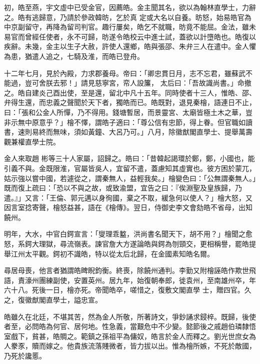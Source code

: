 \begin{pinyinscope}
 初，皓至燕，宇文虛中已受金官，因薦皓。金主聞其名，欲以為翰林直學士，力辭之。皓有逃歸意，乃請於參政韓昉，乞於真
 定或大名以自養。昉怒，始易皓官為中京副留守，再降為留司判官。趣行屢矣，皓乞不就職，昉竟不能屈。金法，雖未易官而曾經任使者，永不可歸，昉遂令皓校云中進士試，蓋欲以計墮皓也。皓復以疾辭。未幾，金主以生子大赦，許使人還鄉，皓與張邵、朱弁三人在遣中。金人懼為患，猶遣人追之，七騎及淮，而皓已登舟。



 十二年七月，見於內殿，力求郡養母。帝曰：「卿忠貫日月，志不忘君，雖蘇武不能過，豈可舍朕去邪！」請見慈寧宮，帟人設簾，
 太后曰：「吾故識尚書。」命撤之。皓自建炎己酉出使，至是還，留北中凡十五年。同時使者十三人，惟皓、邵、弁得生還，而忠義之聲聞於天下者，獨皓而已。皓既對，退見秦檜，語連日不止，曰：「張和公金人所憚，乃不得用。錢塘暫居，而景靈宮、太廟皆極土木之華，豈非示無中原意乎？」檜不懌，謂皓子適曰：「尊公信有忠節，得上眷。但官職如讀書，速則易終而無味，須如黃鐘、大呂乃可。」八月，除徽猷閣直學士、提舉萬壽觀兼權直學士院。



 金人來取趙
 彬等三十人家屬，詔歸之。皓曰：「昔韓起謁環於鄭，鄭，小國也，能引義不與。金既限淮，官屬皆吳人，宜留不遣，蓋慮知其虛實也。彼方困於蒙兀，姑示強以嘗中國，若遽從之，謂秦無人，益輕我矣。」檜變色曰：「公無謂秦無人。」既而復上疏曰：「恐以不與之故，或致渝盟，宜告之曰：『俟淵聖及皇族歸，乃遣。』」又言：「王倫、郭元邁以身徇國，棄之不取，緩急何以使人？」檜大怒，又因言室捻寄聲，檜怒益甚，語在《檜傳》。翌日，侍御史李文會劾皓不省母，出知饒州。



 明年，大水，中官白鍔宣言：「燮理乖盭，洪尚書名聞天下，胡不用？」檜聞之愈怒，系鍔大理獄，尋流嶺表。諫官詹大方遂論皓與鍔為刎頸交，更相稱譽，罷皓提舉江州太平觀。鍔初不識皓，特以從太后北歸，在金國素知皓名爾。



 尋居母喪，他言者猶謂皓睥睨鈞衡。終喪，除饒州通判。李勤又附檜誣皓作欺世飛語，責濠州團練副使，安置英州。居九年，始復朝奉郎，徙袁州，至南雄州卒，年六十八。死後一日，檜亦死。帝聞皓卒，嗟惜之，復敷文閣直學
 士，贈四官。久之，復徽猷閣直學士，謚忠宣。



 皓雖久在北廷，不堪其苦，然為金人所敬，所著詩文，爭鈔誦求鋟梓。既歸，後使者至，必問皓為何官、居何地。性急義，當艱危中不少變。懿節後之戚趙伯璘隸悟室戲下，貧甚，皓賙之。範鎮之孫祖平為傭奴，皓言於金人而釋之。劉光世庶女為人豢豕，贖而嫁之。他貴族流落賤微者，皆力拔以出。惟為檜所嫉，不死於敵國，乃死於讒慝。




\end{pinyinscope}
